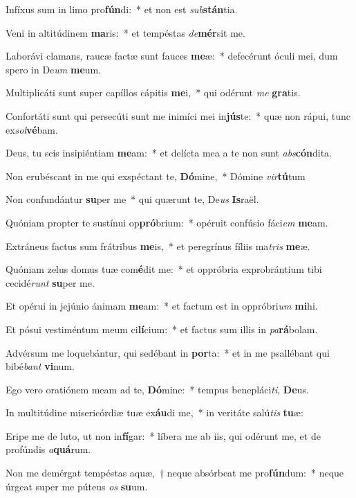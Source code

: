 \item Infíxus sum in limo pro\textbf{fún}di:~* et non est \textit{sub}\textbf{stán}tia.
\item Veni in altitúdinem \textbf{ma}ris:~* et tempéstas \textit{de}\textbf{mér}sit me.
\item Laborávi clamans, raucæ factæ sunt fauces \textbf{me}æ:~* defecérunt óculi mei, dum spero in De\textit{um} \textbf{me}um.
\item Multiplicáti sunt super capíllos cápitis \textbf{me}i,~* qui odérunt \textit{me} \textbf{gra}tis.
\item Confortáti sunt qui persecúti sunt me inimíci mei in\textbf{jús}te:~* quæ non rápui, tunc ex\textit{sol}\textbf{vé}bam.
\item Deus, tu scis insipiéntiam \textbf{me}am:~* et delícta mea a te non sunt \textit{abs}\textbf{cón}dita.
\item Non erubéscant in me qui exspéctant te, \textbf{Dó}mine,~* Dómine \textit{vir}\textbf{tú}tum
\item Non confundántur \textbf{su}per me~* qui quærunt te, De\textit{us} \textbf{Is}raël.
\item Quóniam propter te sustínui op\textbf{pró}brium:~* opéruit confúsio fáci\textit{em} \textbf{me}am.
\item Extráneus factus sum frátribus \textbf{me}is,~* et peregrínus fíliis ma\textit{tris} \textbf{me}æ.
\item Quóniam zelus domus tuæ com\textbf{é}dit me:~* et oppróbria exprobrántium tibi cecidé\textit{runt} \textbf{su}per me.
\item Et opérui in jejúnio ánimam \textbf{me}am:~* et factum est in oppróbri\textit{um} \textbf{mi}hi.
\item Et pósui vestiméntum meum ci\textbf{lí}cium:~* et factus sum illis in \textit{pa}\textbf{rá}bolam.
\item Advérsum me loquebántur, qui sedébant in \textbf{por}ta:~* et in me psallébant qui bibé\textit{bant} \textbf{vi}num.
\item Ego vero oratiónem meam ad te, \textbf{Dó}mine:~* tempus benepláci\textit{ti}, \textbf{De}us.
\item In multitúdine misericórdiæ tuæ ex\textbf{áu}di me,~* in veritáte salú\textit{tis} \textbf{tu}æ:
\item Eripe me de luto, ut non in\textbf{fí}gar:~* líbera me ab iis, qui odérunt me, et de profúndis \textit{a}\textbf{quá}rum.
\item Non me demérgat tempéstas aquæ,~† neque absórbeat me pro\textbf{fún}dum:~* neque úrgeat super me púteus \textit{os} \textbf{su}um.
